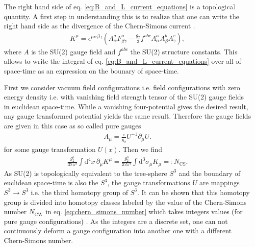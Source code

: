 \documentclass[13pt,a4paper,twoside,titlepage]{article}
\begin{document}
The right hand side of eq. \eqref{eq:B_and_L_current_equations} is a topological quantity.
A first step in understanding this is to realize that one can write the right hand side as the divergence of the Chern-Simons current \cite[eq. 4.2, 4.3]{Cline:2006ts_Baryogenesis}.
\begin{align}
    \label{eq:chern_simons_current}
    K^\mu = \epsilon^{\mu \alpha \beta \gamma} \left( A^a_\alpha F^a_{\beta \gamma} - \frac{g_2}{3} f^{abc} A^a_\alpha A^b_\beta A^c_\gamma \right),
\end{align}
where $A$ is the SU(2) gauge field and $f^{abc}$ the SU(2) structure constants.
This allows to write the integral of eq. \eqref{eq:B_and_L_current_equations}
over all of space-time as an expression on the bounary of space-time.

\noindent
First we consider vacuum field configurations i.e. field configurations with zero energy density i.e. with vanishing field strength tensor of the SU(2) gauge fields in euclidean space-time. While a vanishing four-potential gives the desired result, any gauge transformed potential yields the same result.
Therefore the gauge fields are given in this case as so called pure gauges \cite[sec. 2.1]{Di_Luzio_2020_Landscape_of_QCD_Axion_models}
\begin{align}
    A_\mu = \frac{i}{g_2} U^{-1} \partial_\mu U.
\end{align}
for some gauge transformation $U(x)$.
Then we find
\begin{align}
    \label{eq:chern_simons_number}
    \frac{g_2^3}{32 \pi^2} \int \mathrm{d}^4 x \, \partial_\mu K^\mu =
    \frac{g_2^3}{32 \pi^2} \int \mathrm{d}^3 \sigma_\mu K_\mu
     =: N_{\mathrm{CS}}.
\end{align}
As SU(2) is topologically equivalent to the tree-sphere $S^3$ and the boundary of euclidean space-time is also the $S^3$, the gauge transformations $U$ are
mappings $S^3 \to S^3$ i.e. the third homotopy group of $S^3$.
It can be shown that this homotopy group is divided into homotopy classes labeled by the value of the Chern-Simons number $N_\mathrm{CW}$ in eq. \eqref{eq:chern_simons_number} which takes integers values (for pure gauge configurations) \cite{homotopy_spheres}.
As the integers are a discrete set, one can not continuously deform a gauge configuration into another one with a different Chern-Simons number.
\end{document}
